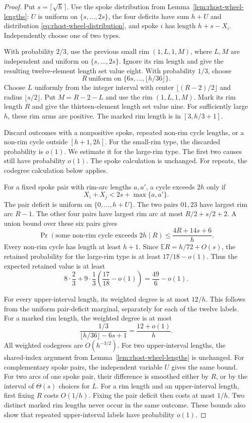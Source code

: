 \begin{proof}
Put $s=\lceil\sqrt h\rceil$.
Use the spoke distribution from Lemma~\ref{lem:rhost-wheel-lengths}:
$U$ is uniform on $\{s,\ldots,2s\}$, the four deficits have sum $h+U$ and distribution
\eqref{eq:rhost-wheel-distribution}, and spoke $i$ has length $h+s-X_i$.
Independently choose one of two types.

With probability $2/3$, use the previous small rim $(1,L,1,M)$, where $L,M$ are independent and uniform on $\{s,\ldots,2s\}$.
Ignore its rim length and give the resulting twelve-element length set value eight.
With probability $1/3$, choose
\[
 R\ \text{uniform on }\{6s,\ldots,\lfloor h/36\rfloor\}.
\]
Choose $L$ uniformly from the integer interval with center $\lfloor(R-2)/2\rfloor$ and radius $\lfloor s/2\rfloor$.
Put $M=R-2-L$ and use the rim $(1,L,1,M)$.
Mark its rim length $R$ and give the thirteen-element length set value nine.
For sufficiently large $h$, these rim arms are positive.
The marked rim length is in $[3,h/3+1]$.

Discard outcomes with a nonpositive spoke, repeated non-rim cycle lengths, or a non-rim cycle outside $[h+1,2h]$.
For the small-rim type, the discarded probability is $o(1)$.
We estimate it for the large-rim type.
The first two causes still have probability $o(1)$.
The spoke calculation is unchanged.
For repeats, the codegree calculation below applies.

For a fixed spoke pair with rim-arc lengths $a,a'$, a cycle exceeds $2h$ only if
\[
 X_i+X_j<2s+\max\{a,a'\}.
\]
The pair deficit is uniform on $\{0,\ldots,h+U\}$.
The two pairs $01,23$ have largest rim arc $R-1$.
The other four pairs have largest rim arc at most $R/2+s/2+2$.
A union bound over these six pairs gives
\[
 \Pr(\text{some non-rim cycle exceeds }2h\mid R)
 \le\frac{4R+14s+6}{h}.
\]
Every non-rim cycle has length at least $h+1$.
Since $\mathbb E R=h/72+O(s)$, the retained probability for the large-rim type is at least $17/18-o(1)$.
Thus the expected retained value is at least
\begin{equation}
 8\cdot\frac23+9\cdot\frac13\left(\frac{17}{18}-o(1)\right)
 =\frac{49}{6}-o(1).
 \label{eq:rhost-wheel-value}
\end{equation}

For every upper-interval length, its weighted degree is at most $12/h$.
This follows from the uniform pair-deficit marginal, separately for each of the twelve labels.
For a marked rim length, the weighted degree is at most
\[
 \frac{1/3}{\lfloor h/36\rfloor-6s+1}
 =\frac{12+o(1)}h.
\]
All weighted codegrees are $O(h^{-3/2})$.
For two upper-interval lengths, the shared-index argument from Lemma~\ref{lem:rhost-wheel-lengths} is unchanged.
For complementary spoke pairs, the independent variable $U$ gives the same bound.
For two arcs of one spoke pair, their difference is smoothed either by $R$, or by the interval of $\Theta(s)$ choices for $L$.
For a rim length and an upper-interval length, first fixing $R$ costs $O(1/h)$.
Fixing the pair deficit then costs at most $1/h$.
Two distinct marked rim lengths never occur in the same outcome.
These bounds also show that repeated upper-interval labels have probability $o(1)$.


\end{proof}
